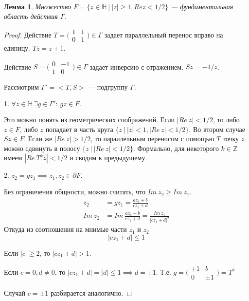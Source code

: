 \documentclass[11pt]{article}
\newtheorem{lemma}{Лемма}
\newcommand{\Z}{\mathbb{Z}}
\begin{document}
\begin{lemma}
    Множество $F = \{z \in \mathbb{H}\ |\ |z| \geq 1, Re z < 1/2 \}$ --- фундаментальная область действия $\Gamma$.
\end{lemma}
\begin{proof}
    Действие
    $T = \big(\begin{smallmatrix}
      1 & 1\\
      0 & 1
    \end{smallmatrix}\big) \in \Gamma$
    задает параллельный перенос вправо на единицу.
    $Tz = z + 1$.

    Действие
    $S = \big(\begin{smallmatrix}
      0 & -1\\
      1 & 0
    \end{smallmatrix}\big) \in \Gamma$
    задает инверсию с отражением.
    $Sz = -1/z$.

    Рассмотрим $\Gamma' = <T, S>$ --- подгруппу $\Gamma$.
    
    1. $\forall z \in \mathbb{H}\ \exists g \in \Gamma':\ gz \in F$.

    Это можно понять из геометрических соображений.
    Если $|Re\ z| < 1/2$, то либо $z \in F$, либо $z$ попадает в часть круга $\{z\ |\ |z| < 1, |Re\ z| < 1/2 \}$.
    Во втором случае $Sz \in F$.
    Если же $|Re\ z| > 1/2$, то параллельным переносом с помощью $T$ точку $z$ можно сдвинуть в полосу $\{z\ |\ |Re\ z| < 1/2\}$.
    Формально, для некоторого $k \in \Z$ имеем $|Re\ T^kz| < 1/2$ и сводим к предыдущему.

    2. $z_2 = g z_1 \implies z_1, z_2 \in \partial F$.

    Без ограничения общности, можно считать, что $Im\ z_2 \geq Im\ z_1$.
    \begin{align*}
        z_2 &= g z_1 = \frac{az_1 + b}{cz_1 + d} \\
        Im\ z_2 &= Im\ \frac{az_1 + b}{cz_1 + d} = \frac{Im\ z_1}{|cz_1+d|^2}
    \end{align*}
    Откуда из соотношения на мнимые части $z_1$ и $z_2$
    \begin{equation*}
        |cz_1+d| \leq 1
    \end{equation*}

    Если $|c| \geq 2$, то $|cz_1 + d| > 1$.

    Если $c = 0, d \neq 0$, то $|cz_1 + d| = |d| \leq 1 \implies d = \pm 1$.
    Т.е.
    $g = \big(\begin{smallmatrix}
      \pm 1 & b \\
      0 & \pm 1
    \end{smallmatrix}\big) = T^b$

    Случай $c = \pm 1$ разбирается аналогично.
\end{proof}
\end{document}
